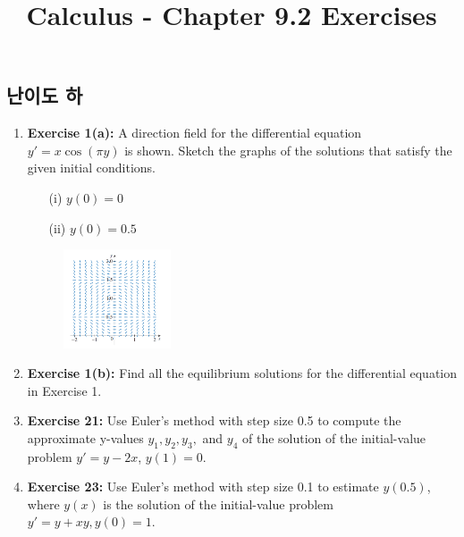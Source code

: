 \documentclass[12pt, a4paper]{article}
\title{Calculus - Chapter 9.2 Exercises}
\begin{document}
\maketitle

\subsection*{난이도 하}
\begin{enumerate}
    \item \textbf{Exercise 1(a):} A direction field for the differential equation $y' = x \cos(\pi y)$ is shown. Sketch the graphs of the solutions that satisfy the given initial conditions.
    \begin{itemize}
        \item[(i)] $y(0)=0$
        \item[(ii)] $y(0)=0.5$
    \end{itemize}
    
    \begin{figure}[htbp] %
         \centering %
        \includegraphics[width=0.3\textwidth]{graph1.png} %
    \end{figure}

    \item \textbf{Exercise 1(b):} Find all the equilibrium solutions for the differential equation in Exercise 1.

    \item \textbf{Exercise 21:} Use Euler's method with step size 0.5 to compute the approximate y-values $y_1, y_2, y_3,$ and $y_4$ of the solution of the initial-value problem $y' = y - 2x$, $y(1)=0$.

    \item \textbf{Exercise 23:} Use Euler's method with step size 0.1 to estimate $y(0.5)$, where $y(x)$ is the solution of the initial-value problem $y' = y + xy, y(0)=1$.
\end{enumerate}

\hrulefill
\vspace{1em}
\end{document}
